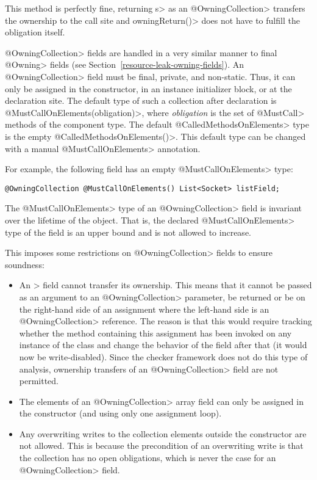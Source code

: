 This method is perfectly fine, returning \<s> as an \<@OwningCollection> transfers the ownership to the call site and \<owningReturn()> does not have to fulfill the obligation itself.

\<@OwningCollection> fields are handled in a very similar manner to final \<@Owning> fields (see Section~\ref{resource-leak-owning-fields}).
An \<@OwningCollection> field must be final, private, and non-static. Thus, it
can only be assigned in the constructor, in an instance initializer block, or at the declaration site.
The default type of such a collection after declaration is \<@MustCallOnElements(obligation)>, where \textit{obligation} is the set of \<@MustCall> methods of the component type. The default \<@CalledMethodsOnElements> type is the empty \<@CalledMethodsOnElements({})>. This default type can be changed with a manual \<@MustCallOnElements> annotation.

For example, the following field has an empty \<@MustCallOnElements> type:

\begin{verbatim}
@OwningCollection @MustCallOnElements() List<Socket> listField;
\end{verbatim}

The \<@MustCallOnElements> type of an \<@OwningCollection> field is invariant over the lifetime of the object. That is, the declared \<@MustCallOnElements> type of the field is an upper bound and is not allowed to increase.

This imposes some restrictions on \<@OwningCollection> fields to ensure soundness:

\begin{itemize}
  \item An \@OwningCollection> field cannot transfer its ownership. This means that it cannot be passed as an argument to an \<@OwningCollection> parameter, be returned or be on the right-hand side of an assignment where the left-hand side is an \<@OwningCollection> reference. The reason is that this would require tracking whether the method containing this assignment has been invoked on any instance of the class and change the behavior of the field after that (it would now be write-disabled). Since the checker framework does not do this type of analysis, ownership transfers of an \<@OwningCollection> field are not permitted.
  \item The elements of an \<@OwningCollection> array field can only be assigned in the constructor (and using only one assignment loop).
  \item Any overwriting writes to the collection elements outside the constructor are not allowed. This is because the precondition of an overwriting write is that the collection has no open obligations, which is never the case for an \<@OwningCollection> field.
\end{itemize}

